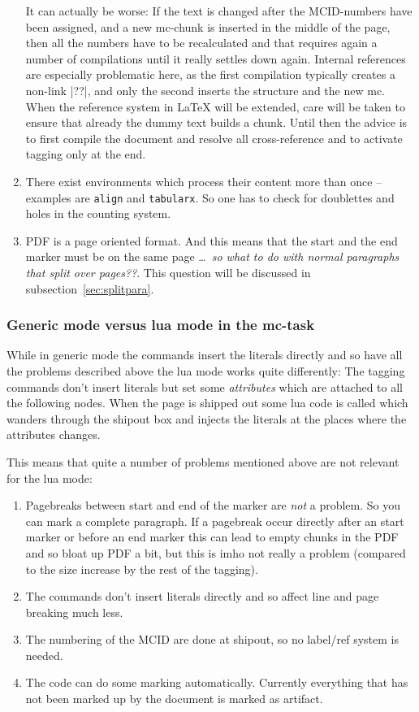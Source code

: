 \documentclass[DIV=12,parskip=half-,bibliography=totoc]{scrartcl}
\newcommand\PDF{PDF}
\begin{document}
\begin{enumerate}[beginpenalty=10000]
  It can actually be worse: If the text is changed after the MCID-numbers have been assigned, and
  a new mc-chunk is inserted in the middle of the page, then all the numbers have to be recalculated
  and that requires again a number of compilations until it really settles down again.
  Internal references are especially problematic here, as the first compilation
  typically creates a non-link |??|, and only the second inserts the structure and the new mc.
  When the reference system in LaTeX will be extended, care will be taken to ensure that already the dummy text builds a chunk.
  Until then the advice is to first compile the document and resolve all cross-reference and to activate tagging only at the end.


  \item
  There exist environments which process their content more than once -- examples are \texttt{align} and \texttt{tabularx}.
       So one has to check for doublettes and holes in the counting system.


  \item
  \PDF{} is a page oriented format. And this means that the start and the end marker must be on the same page \ldots\ \emph{so what to do with normal paragraphs that split over pages??}. This question will be discussed in subsection~\ref{sec:splitpara}.
\end{enumerate}


\subsubsection{Generic mode versus lua mode in the mc-task}

While in generic mode the commands insert the literals directly and so have all the problems described above the lua mode works quite differently: The tagging commands don't insert literals but set some \emph{attributes} which are attached to all the following nodes. When the page is shipped out some lua code is called which wanders through the shipout box and injects the literals at the places where the attributes changes.

This means that quite a number of problems mentioned above are not relevant for the lua mode:

\begin{enumerate}
\item Pagebreaks between start and end of the marker are \emph{not} a problem. So you can mark a complete paragraph. If a pagebreak occur directly after an start marker or before an end marker this can lead to empty chunks in the \PDF{} and so bloat up \PDF{} a bit, but this is imho not really a problem (compared to the size increase by the rest of the tagging).
\item The commands don't insert literals directly and so affect line and page breaking much less.
\item The numbering of the MCID are done at shipout, so no label/ref system is needed.
\item The code can do some marking automatically. Currently everything that has not been marked up by the document is marked as artifact.
\end{enumerate}
\end{document}
